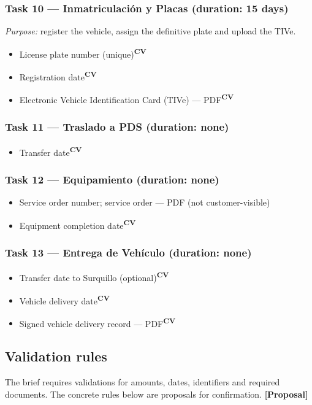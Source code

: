 \documentclass[11pt,a4paper]{article}
\newcommand{\tagprop}{\textcolor{orange!80!black}{\textbf{[Proposal]}}}
\newcommand{\cv}{\textsuperscript{\textcolor{panablue}{\textbf{CV}}}}
\begin{document}
\subsubsection*{Task 10 --- Inmatriculación y Placas (duration: 15 days)}
\textit{Purpose:} register the vehicle, assign the definitive plate and upload
the TIVe.
\begin{itemize}
	\item License plate number (unique)\cv{}
	\item Registration date\cv{}
	\item Electronic Vehicle Identification Card (TIVe) --- PDF\cv{}
\end{itemize}

\subsubsection*{Task 11 --- Traslado a PDS (duration: none)}
\begin{itemize}
	\item Transfer date\cv{}
\end{itemize}

\subsubsection*{Task 12 --- Equipamiento (duration: none)}
\begin{itemize}
	\item Service order number; service order --- PDF (not customer-visible)
	\item Equipment completion date\cv{}
\end{itemize}

\subsubsection*{Task 13 --- Entrega de Vehículo (duration: none)}
\begin{itemize}
	\item Transfer date to Surquillo (optional)\cv{}
	\item Vehicle delivery date\cv{}
	\item Signed vehicle delivery record --- PDF\cv{}
\end{itemize}

\subsection{Validation rules}

The brief requires validations for amounts, dates, identifiers and required documents. The concrete rules below are proposals for confirmation. \tagprop{}
\end{document}
